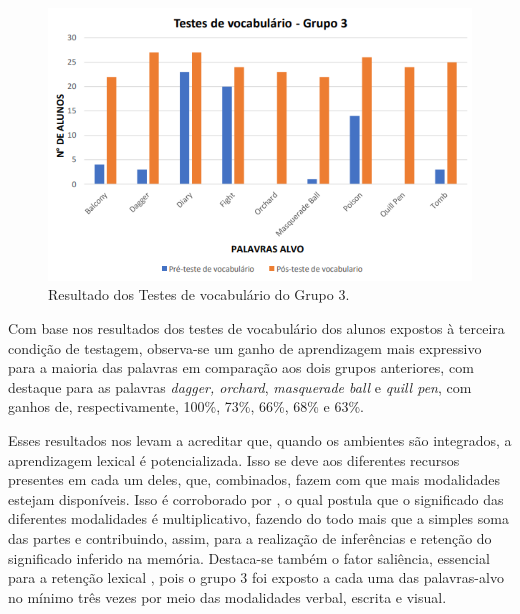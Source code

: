 \begin{figure}[htpb]
    \centering
    \begin{minipage}{.75\textwidth}
    \includegraphics[width=\textwidth]{graph-05.png}
    \caption{Resultado dos Testes de vocabulário do Grupo 3.}
    \label{graph-05}
    \end{minipage}
\end{figure}

Com base nos resultados dos testes de vocabulário dos alunos expostos à
terceira condição de testagem, observa-se um ganho de aprendizagem mais
expressivo para a maioria das palavras em comparação aos dois grupos
anteriores, com destaque para as palavras \emph{dagger, orchard},
\emph{masquerade ball} e \emph{quill pen}, com ganhos de,
respectivamente, 100\%, 73\%, 66\%, 68\% e 63\%.

Esses resultados nos levam a acreditar que, quando os ambientes são integrados,
a aprendizagem lexical é potencializada. Isso se deve aos diferentes recursos
presentes em cada um deles, que, combinados, fazem com que mais modalidades
estejam disponíveis. Isso é corroborado por \textcite{lemke2002}, o qual
postula que o significado das diferentes modalidades é multiplicativo, fazendo
do todo mais que a simples soma das partes e contribuindo, assim, para a
realização de inferências e retenção do significado inferido na memória.
Destaca-se também o fator saliência, essencial para a retenção lexical
\cite{procopio2016,saito2015}, pois o grupo 3 foi exposto a cada uma das
palavras-alvo no mínimo três vezes por meio das modalidades verbal, escrita e
visual.


